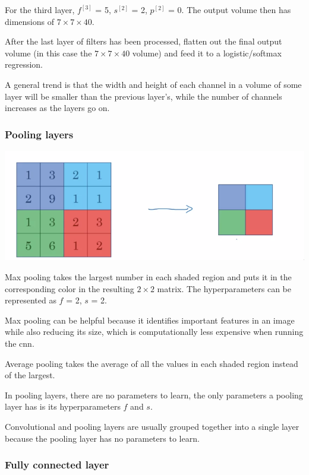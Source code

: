 \documentclass[12pt]{article}
\begin{document}
For the third layer, $f^{[3]}$ = 5, $s^{[2]}$ = 2, $p^{[2]}$ = 0. The output volume
then has dimensions of $7 \times 7 \times 40$.

After the last layer of filters has been processed, flatten out the final output volume
(in this case the $7 \times 7 \times 40$ volume) and feed it to a logistic/softmax regression.

A general trend is that the width and height of each channel in a volume of some layer will
be smaller than the previous layer's, while the number of channels increases as the layers go on.

\subsubsection{Pooling layers}

\includegraphics[scale=.5]{images/max-pooling.png}

Max pooling takes the largest number in each shaded region and puts it in the corresponding
color in the resulting $2 \times 2$ matrix. The hyperparameters can be represented as $f$ = 2,
$s$ = 2.

Max pooling can be helpful because it identifies important features in an image while also
reducing its size, which is computationally less expensive when running the cnn.

Average pooling takes the average of all the values in each shaded region instead of the
largest.

In pooling layers, there are no parameters to learn, the only parameters a pooling layer
has is its hyperparameters $f$ and $s$.

Convolutional and pooling layers are usually grouped together into a single layer because
the pooling layer has no parameters to learn.

\subsubsection{Fully connected layer}
\end{document}

